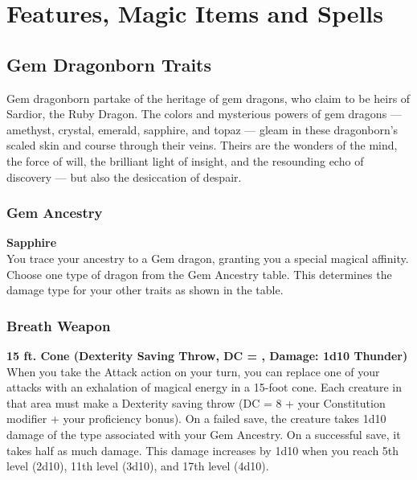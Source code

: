 \documentclass[letterpaper,openany,oneside,twocolumn]{book}
\begin{document}
\onecolumn


\rendercharactersheet

\renderbackgroundsheet

\renderspellsheet


\restoregeometry
\twocolumn

\chapter*{Features, Magic Items and Spells}
\section*{Gem Dragonborn Traits}
Gem dragonborn partake of the heritage of gem dragons, who claim to be heirs of Sardior, the Ruby Dragon. The colors and mysterious powers of gem dragons — amethyst, crystal, emerald, sapphire, and topaz — gleam in these dragonborn's scaled skin and course through their veins. Theirs are the wonders of the mind, the force of will, the brilliant light of insight, and the resounding echo of discovery — but also the desiccation of despair.
\subsection*{Gem Ancestry}
\textbf{Sapphire} \\
You trace your ancestry to a Gem dragon, granting you a special magical affinity. Choose one type of dragon from the Gem Ancestry table. This determines the damage type for your other traits as shown in the table.
\subsection*{Breath Weapon}
\textbf{15 ft. Cone (Dexterity Saving Throw, DC = , Damage: 1d10 Thunder)} \\
When you take the Attack action on your turn, you can replace one of your attacks with an exhalation of magical energy in a 15-foot cone. Each creature in that area must make a Dexterity saving throw (DC = 8 + your Constitution modifier + your proficiency bonus). On a failed save, the creature takes 1d10 damage of the type associated with your Gem Ancestry. On a successful save, it takes half as much damage. This damage increases by 1d10 when you reach 5th level (2d10), 11th level (3d10), and 17th level (4d10).
\end{document}

